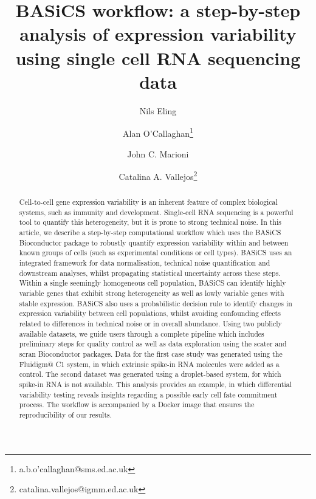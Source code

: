 \documentclass[9pt,a4paper,]{extarticle}
\begin{document}
\pagestyle{front}

\title{BASiCS workflow: a step-by-step analysis of expression variability using single cell RNA sequencing data}

\author[1,2,3]{Nils Eling}
\author[4]{Alan O'Callaghan\thanks{\ttfamily a.b.o'callaghan@sms.ed.ac.uk}}
\author[1,2]{John C. Marioni}
\author[4,5]{Catalina A. Vallejos\thanks{\ttfamily catalina.vallejos@igmm.ed.ac.uk}}

\maketitle
\thispagestyle{front}

\begin{abstract}
Cell-to-cell gene expression variability is an inherent feature of complex
biological systems, such as immunity and development. Single-cell RNA
sequencing is a powerful tool to quantify this heterogeneity, but it is prone
to strong technical noise. In this article, we describe a step-by-step
computational workflow which uses the BASiCS Bioconductor package to robustly
quantify expression variability within and between known groups of cells (such
as experimental conditions or cell types). BASiCS uses an integrated framework
for data normalisation, technical noise quantification and downstream
analyses, whilst propagating statistical uncertainty across these steps.
Within a single seemingly homogeneous cell population, BASiCS can identify
highly variable genes that exhibit strong heterogeneity as well as lowly
variable genes with stable expression. BASiCS also uses a probabilistic
decision rule to identify changes in expression variability between cell
populations, whilst avoiding confounding effects related to differences in
technical noise or in overall abundance. Using two publicly available
datasets, we guide users through a complete pipeline which includes
preliminary steps for quality control as well as data exploration
using the scater and scran Bioconductor packages. Data for the first case
study was generated using the Fluidigm@ C1 system, in which extrinsic
spike-in RNA molecules were added as a control. The second dataset was
generated using a droplet-based system, for which spike-in RNA is not
available. This analysis provides an example, in which differential
variability testing reveals insights regarding a possible early cell fate
commitment process. The workflow is accompanied by a Docker image that
ensures the reproducibility of our results.
\end{abstract}
\end{document}
